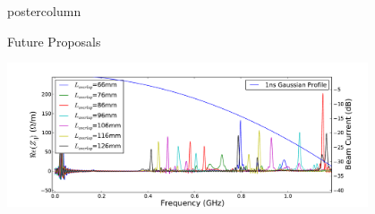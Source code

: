 \documentclass[final,hyperref={pdfpagelabels=false}]{beamer}
\begin{document}
\begin{frame}
\begin{columns}
\begin{column}{.49\textwidth}
\begin{beamercolorbox}[center,wd=\textwidth]{postercolumn}
\begin{minipage}[T]{.95\textwidth}
{\begin{block}{Future Proposals}
\begin{itemize}
\begin{small}
\end{small}
\end{itemize}
\begin{center}\includegraphics[width=0.8\textwidth]{TUPRI030f6.pdf}
\end{center}
\end{block}



\vfill

          }
        \end{minipage}
      \end{beamercolorbox}
    \end{column}
  \end{columns}

\end{frame}
\end{document}
